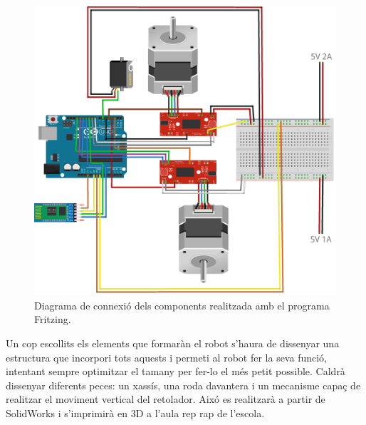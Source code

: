 \begin{figure}[H]
	\centering
	\includegraphics[scale=0.4]{RobotFritz}
	\caption{Diagrama de connexió dels components realitzada amb el programa Fritzing.}
	\label{fig:connexio1}
\end{figure}

Un cop escollits els elements que formaràn el robot s'haura de dissenyar una estructura que incorpori tots aquests i permeti al robot fer la seva funció, intentant sempre optimitzar el tamany per fer-lo el més petit possible. Caldrà dissenyar diferents peces: un xassís, una roda davantera i un mecanisme capaç de realitzar el moviment vertical del retolador. Aixó es realitzarà a partir de SolidWorks i s'imprimirà en 3D a l'aula rep rap de l'escola. 

